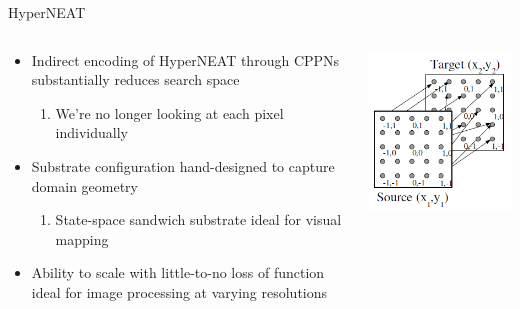\documentclass[xcolor=dvipsnames]{beamer}
\newcommand\Fontvi{\fontsize{7}{10}\selectfont}
\begin{document}
	\begin{frame}{HyperNEAT}
		\begin{columns}[T]
			\begin{column}{.5\textwidth}
				\begin{itemize}
					\item Indirect encoding of HyperNEAT through CPPNs substantially reduces search space
					\begin{enumerate}\Fontvi
						\item We're no longer looking at each pixel individually
					\end{enumerate}
					\item Substrate configuration hand-designed to capture domain geometry
					\begin{enumerate}\Fontvi
						\item State-space sandwich substrate ideal for visual mapping
					\end{enumerate}
					\item Ability to scale with little-to-no loss of function ideal for image processing at varying resolutions
				\end{itemize}
			\end{column}
			\begin{column}{.5\textwidth}
				\includegraphics[width=\textwidth]{StateSpaceSandwichSubstrate}
			\end{column}
		\end{columns}			
	\end{frame}
	
\end{document}
